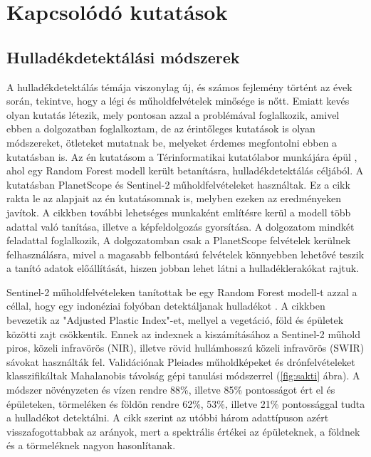 \chapter{Kapcsolódó kutatások}
\label{ch:related_research}

\section{Hulladékdetektálási módszerek}
\label{ch:waste-detection-methods}

A hulladékdetektálás témája viszonylag új, és számos fejlemény történt az évek során, tekintve, hogy a légi és műholdfelvételek minősége is nőtt. Emiatt kevés olyan kutatás létezik, mely pontosan azzal a problémával foglalkozik, amivel ebben a dolgozatban foglalkoztam, de az érintőleges kutatások is olyan módszereket, ötleteket mutatnak be, melyeket érdemes megfontolni ebben a kutatásban is. Az én kutatásom a Térinformatikai kutatólabor munkájára épül \cite{magyar2023}, ahol egy Random Forest modell került betanításra, hulladékdetektálás céljából. A kutatásban PlanetScope és Sentinel-2 műholdfelvételeket használtak. Ez a cikk rakta le az alapjait az én kutatásomnak is, melyben ezeken az eredményeken javítok. A cikkben további lehetséges munkaként említésre kerül a modell több adattal való tanítása, illetve a képfeldolgozás gyorsítása. A dolgozatom mindkét feladattal foglalkozik, A dolgozatomban csak a PlanetScope felvételek kerülnek felhasználásra, mivel a magasabb felbontású felvételek könnyebben lehetővé teszik a tanító adatok előállítását, hiszen jobban lehet látni a hulladéklerakókat rajtuk.

\citeauthor{sakti2023} Sentinel-2 műholdfelvételeken tanítottak be egy Random Forest modell-t azzal a céllal, hogy egy indonéziai folyóban detektáljanak hulladékot \cite{sakti2023}. A cikkben bevezetik az "Adjusted Plastic Index"-et, mellyel a vegetáció, föld és épületek közötti zajt csökkentik. Ennek az indexnek a kiszámításához a Sentinel-2 műhold piros, közeli infravörös (NIR), illetve rövid hullámhosszú közeli infravörös (SWIR) sávokat használták fel. Validációnak Pleiades műholdképeket és drónfelvételeket klasszifikáltak Mahalanobis távolság gépi tanulási módszerrel (\ref{fig:sakti} ábra). A módszer növényzeten és vízen rendre 88\%, illetve 85\% pontosságot ért el és épületeken, törmeléken és földön rendre 62\%, 53\%, illetve 21\% pontossággal tudta a hulladékot detektálni. A cikk szerint az utóbbi három adattípuson azért visszafogottabbak az arányok, mert a spektrális értékei az épületeknek, a földnek és a törmeléknek nagyon hasonlítanak.


